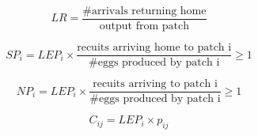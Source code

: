 \documentclass[12pt, oneside]{article}   	%
\begin{document}
\begin{equation}
LR = \frac{\text{\# arrivals returning home}}{\text{output from patch}}
\end{equation}

\begin{equation}
SP_i = LEP_{i} \times \frac{\text{recuits arriving home to patch i}}{\# \text{eggs produced by patch i}} \geq 1 %
\end{equation}

\begin{equation}
NP_i = LEP_{i} \times \frac{\text{recuits arriving to patch i}}{\# \text{eggs produced by patch i}} \geq 1 %
\end{equation}

\begin{equation}
C_{ij} = LEP_i \times p_{ij}
\end{equation}





\end{document}
